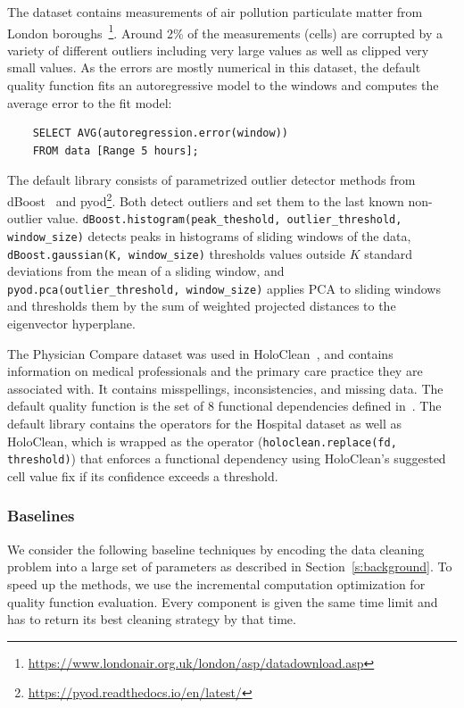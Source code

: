  The dataset contains measurements of air pollution particulate matter from London boroughs~\footnote{\url{https://www.londonair.org.uk/london/asp/datadownload.asp}}. Around 2\% of the measurements (cells) are corrupted by a variety of different outliers including very large values as well as clipped very small values.  As the errors are mostly numerical in this dataset, the default quality function fits an autoregressive model to the windows and computes the average error to the fit model:
\begin{verbatim}
    SELECT AVG(autoregression.error(window))
    FROM data [Range 5 hours];
\end{verbatim}
\noindent The default library consists of parametrized outlier detector methods from dBoost~\cite{mariet2016outlier} and pyod\footnote{\url{https://pyod.readthedocs.io/en/latest/}}.  Both detect outliers and set them to the last known non-outlier value. \texttt{dBoost.histogram(peak\_theshold, outlier\_threshold, window\_size)} detects peaks in histograms of sliding windows of the data, \texttt{dBoost.gaussian(K, window\_size)} thresholds values outside $K$ standard deviations  from the mean of a sliding window, and \texttt{pyod.pca(outlier\_threshold, window\_size)}  applies PCA to sliding windows and thresholds them by the sum of weighted projected distances to the eigenvector hyperplane.

 The Physician Compare dataset was used in HoloClean~\cite{rekatsinas2017holoclean}, and contains information on medical professionals and the primary care practice they are associated with.  It contains misspellings, inconsistencies, and missing data. The default quality function is the set of 8 functional dependencies defined in~\cite{rekatsinas2017holoclean}.  The default library contains the operators for the Hospital dataset as well as HoloClean, which is wrapped as the operator (\texttt{holoclean.replace(fd, threshold)}) that enforces a functional dependency using HoloClean's suggested cell value fix if its confidence exceeds a threshold.

\subsubsection{Baselines}
We consider the following baseline techniques by encoding the data cleaning problem into a large set of parameters as described in Section~\ref{s:background}. To speed up the methods, we use the incremental computation optimization for quality function evaluation. Every component is given the same time limit and has to return its best cleaning strategy by that time. 

